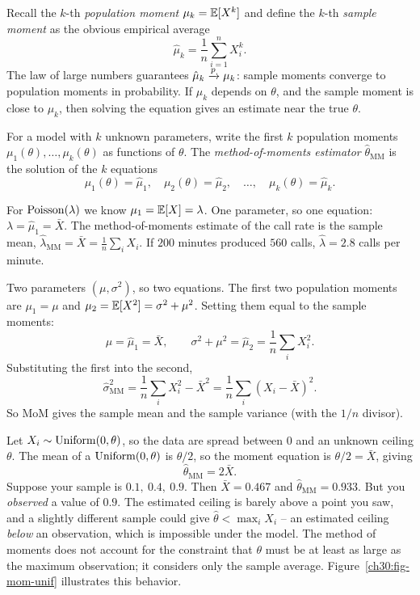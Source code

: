Recall the $k$-th \emph{population moment} $\mu_k = \operatorname{\mathbb{E}}[X^k]$ and define the
$k$-th \emph{sample moment} as the obvious empirical average
\[
  \hat\mu_k = \frac{1}{n} \sum_{i=1}^n X_i^k.
\]
The law of large numbers guarantees
$\hat\mu_k \xrightarrow{p} \mu_k$: sample moments converge to population moments in probability. If $\mu_k$ depends on $\theta$, and the sample moment is close
to $\mu_k$, then solving the equation gives an estimate near the true $\theta$.

\begin{definition}
\label{ch30:def-mom}
For a model with $k$ unknown parameters, write the first $k$ population moments
$\mu_1(\theta),\dots,\mu_k(\theta)$ as functions of $\theta$. The
\emph{method-of-moments estimator} $\hat\theta_{\mathrm{MM}}$ is the solution of
the $k$ equations
\[
  \mu_1(\theta) = \hat\mu_1,\quad \mu_2(\theta) = \hat\mu_2,\quad\dots,\quad
  \mu_k(\theta) = \hat\mu_k.
\]
\end{definition}

\begin{example}
\label{ch30:ex-mom-pois}
For $\operatorname{Poisson}(\lambda)$ we know $\mu_1 = \operatorname{\mathbb{E}}[X] = \lambda$. One parameter, so one
equation: $\lambda = \hat\mu_1 = \bar X$. The method-of-moments estimate of the
call rate is the sample mean,
$\hat\lambda_{\mathrm{MM}} = \bar X = \frac1n\sum_i X_i$. If $200$ minutes
produced $560$ calls, $\hat\lambda = 2.8$ calls per minute.
\end{example}

\begin{example}
\label{ch30:ex-mom-normal}
Two parameters $(\mu,\sigma^2)$, so two equations. The first two population
moments are $\mu_1 = \mu$ and $\mu_2 = \operatorname{\mathbb{E}}[X^2] = \sigma^2 + \mu^2$. Setting them
equal to the sample moments:
\[
  \mu = \hat\mu_1 = \bar X,
  \qquad
  \sigma^2 + \mu^2 = \hat\mu_2 = \frac1n\sum_i X_i^2.
\]
Substituting the first into the second,
\[
  \hat\sigma^2_{\mathrm{MM}} = \frac1n\sum_i X_i^2 - \bar X^2
  = \frac1n\sum_i (X_i - \bar X)^2.
\]
So MoM gives the sample mean and the sample variance (with the $1/n$ divisor).
\end{example}

\begin{example}
\label{ch30:ex-mom-unif}
Let $X_i \sim \operatorname{Uniform}(0,\theta)$, so the data are spread between $0$ and an
unknown ceiling $\theta$. The mean of a $\operatorname{Uniform}(0,\theta)$ is $\theta/2$, so the
moment equation is $\theta/2 = \bar X$, giving
\[
  \hat\theta_{\mathrm{MM}} = 2\bar X.
\]
Suppose your sample is
$0.1,\ 0.4,\ 0.9$. Then $\bar X = 0.467$ and
$\hat\theta_{\mathrm{MM}} = 0.933$. But you \emph{observed} a value of $0.9$.
The estimated ceiling is barely above a point you saw, and a slightly
different sample could give $\hat\theta < \max_i X_i$ -- an estimated ceiling
\emph{below} an observation, which is impossible under the model. The
method of moments does not account for the constraint that $\theta$ must be at least as large as the
maximum observation; it considers only the sample average.
Figure~\ref{ch30:fig-mom-unif} illustrates this behavior.
\end{example}

